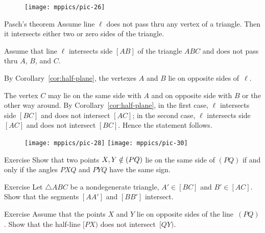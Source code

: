 {

\begin{wrapfigure}{r}{26mm}
\vskip-4mm
\centering
\texttt{[image: mppics/pic-26]}
\end{wrapfigure}

\begin{thm}[\abs]{Pasch's theorem}\label{thm:pasch}
Assume line $\ell$ does not pass thru any vertex of a triangle.
Then it intersects either two or zero sides of the triangle.
\end{thm}

Assume that line $\ell$ intersects side $[AB]$ of the triangle $ABC$ and does not pass thru $A$, $B$, and $C$.

By Corollary~\ref{cor:half-plane}, the vertexes $A$ and $B$ lie on opposite sides of~$\ell$.

}

The vertex $C$ may lie on the same side with $A$ and on opposite side with $B$ or the other way around.
By Corollary~\ref{cor:half-plane}, in the first case, $\ell$ intersects side $[BC]$ and does not intersect $[AC]$; in the second case, $\ell$ intersects side $[AC]$ and does not intersect $[BC]$.
Hence the statement follows.
\qeds

{

\begin{wrapfigure}[5]{r}{29mm}
\vskip-4mm
\centering
\texttt{[image: mppics/pic-28]}
\bigskip
\texttt{[image: mppics/pic-30]}
\end{wrapfigure}

\begin{thm}{Exercise}\label{ex:signs-PXQ-PYQ}
Show that two points $X,Y\z\notin(PQ)$ lie on the same side of $(PQ)$
if and only if the angles $PXQ$ and $PYQ$ have the same sign.
\end{thm}

\begin{thm}{Exercise}\label{ex:chevinas}
Let $\triangle ABC$ be a nondegenerate triangle,
$A'\in[BC]$  and 
$B'\in [AC]$.
Show that the segments $[AA']$ and $[BB']$ intersect.
\end{thm}

\begin{thm}{Exercise}\label{ex:Z}
Assume that the points $X$ and $Y$ lie on opposite sides of the line~$(PQ)$.
Show that the half-line $[PX)$ does not intersect~$[QY)$. 
\end{thm}

}

